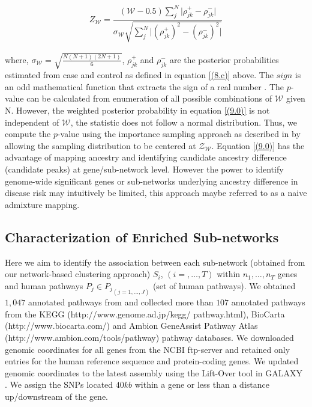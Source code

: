 \documentclass[10pt]{article}
\begin{document}
\setlength\arraycolsep{2pt}
\begin{eqnarray}
Z_{\mathcal{W}} = \dfrac{\left(\mathcal{W}-0.5\right) \sum_{j}^{N}\vert \rho^{+}_{jk}-\rho^{-}_{jk}\vert}{\sigma_{\mathcal{W}}\sqrt{\sum_{j}^{N}\vert (\rho^{+}_{jk})^{2}-(\rho^{-}_{jk})^{2}\vert}} \label{(9.0)}
\end{eqnarray}

where, $\sigma_{\mathcal{W}}=\sqrt{\frac{N(N+1)(2N+1)}{6}}$, $\rho^{+}_{jk}$ and $\rho^{-}_{jk}$ are the posterior probabilities estimated from case and control as defined in equation \ref{(8.c)} above. The $sign$ is an odd mathematical function that extracts the sign of a real number \cite{shiro}. The $p$-value can be calculated from enumeration of all possible combinations of $\mathcal{W}$ given N. However, the weighted posterior probability in equation \ref{(9.0)} is not independent of $\mathcal{W}$, the statistic does not follow a normal distribution. Thus, we compute the $p$-value using the importance sampling approach as described in \cite{wasser,penny} by allowing the sampling distribution to be centered at $\mathcal{Z_{\mathcal{W}}}$. Equation \ref{(9.0)} has the advantage of mapping ancestry and identifying candidate ancestry difference (candidate peaks) at gene/sub-network level. However the power to identify genome-wide significant genes or sub-networks underlying ancestry difference in disease risk may intuitively be limited, this approach maybe referred to as a naive admixture mapping.

\subsection*{Characterization of Enriched Sub-networks}

Here we aim to identify the association between each sub-network (obtained from our network-based clustering approach) $S_{i}$, $(i=,\ldots,T)$ within $n_{1},\ldots, n_{T}$ genes and human pathways $P_{j} \in {P_{j}}_{(j=1,\ldots,J)}$ (set of human pathways). We obtained $1,047$ annotated pathways from \cite{pathsi} and collected more than $107$ annotated pathways from the KEGG (http://www.genome.ad.jp/kegg/ pathway.html), BioCarta (http://www.biocarta.com/) and Ambion GeneAssist Pathway Atlas (http://www.ambion.com/tools/pathway) pathway databases. We downloaded genomic coordinates for all genes from the NCBI ftp-server \cite{ncbi} and retained only entries for the human reference sequence and protein-coding genes. We updated genomic coordinates to the latest assembly using the Lift-Over tool in GALAXY \cite{liftover}. We assign the SNPs located $40kb$ within a gene or less than a distance up/downstream of the gene.
\end{document}
